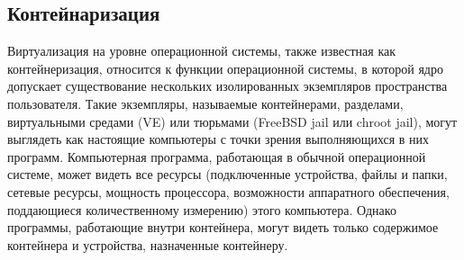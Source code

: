 \subsection{Контейнаризация}\label{sec:cont_virt}

Виртуализация на уровне операционной системы, также известная как контейнеризация, относится к функции операционной системы, в которой ядро допускает существование нескольких изолированных экземпляров пространства пользователя. Такие экземпляры, называемые контейнерами, разделами, виртуальными средами (VE) или тюрьмами (FreeBSD jail или chroot jail), могут выглядеть как настоящие компьютеры с точки зрения выполняющихся в них программ. Компьютерная программа, работающая в обычной операционной системе, может видеть все ресурсы (подключенные устройства, файлы и папки, сетевые ресурсы, мощность процессора, возможности аппаратного обеспечения, поддающиеся количественному измерению) этого компьютера. Однако программы, работающие внутри контейнера, могут видеть только содержимое контейнера и устройства, назначенные контейнеру.





